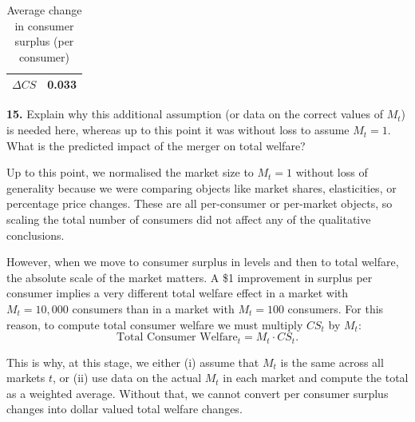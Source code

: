 \documentclass{article}
\begin{document}
\begin{table}[H]
\centering
\caption{Average change in consumer surplus (per consumer)}
\begin{tabular}{lc}
\hline $\Delta CS$ & 0.033 \\ \hline
\end{tabular}\end{table}



\begin{tcolorbox}
\textbf{15.} Explain why this additional assumption
(or data on the correct values of $M_{t}$) is needed here, whereas up to
this point it was without loss to assume $M_{t}=1$. What is the predicted
impact of the merger on total welfare?
\end{tcolorbox}

Up to this point, we normalised the market size to $M_t = 1$ without loss of generality because we were comparing objects like market shares, elasticities, or percentage price changes. These are all {per-consumer} or {per-market} objects, so scaling the total number of consumers did not affect any of the qualitative conclusions.

However, when we move to {consumer surplus in levels} and then to {total welfare}, the absolute scale of the market matters. A \$1 improvement in surplus per consumer implies a very different total welfare effect in a market with $M_t = 10{,}000$ consumers than in a market with $M_t = 100$ consumers. For this reason, to compute total consumer welfare we must multiply $CS_t$ by $M_t$:
\[
\text{Total Consumer Welfare}_t = M_t \cdot CS_t.
\]

This is why, at this stage, we either (i) assume that $M_t$ is the same across all markets $t$, or (ii) use data on the actual $M_t$ in each market and compute the total as a weighted average. Without that, we cannot convert per consumer surplus changes into dollar valued total welfare changes.
\end{document}
